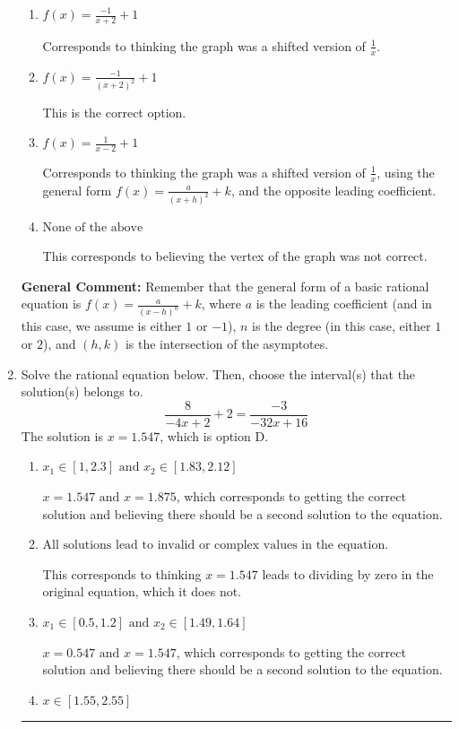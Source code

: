 \documentclass{extbook}[14pt]
\newcommand{\litem}[1]{\item #1

\rule{\textwidth}{0.4pt}}
\begin{document}
\begin{enumerate}
{\begin{enumerate}[label=\Alph*.]
Corresponds to using the general form $f(x) = \frac{a}{(x+h)^2}+k$ and the opposite leading coefficient.
\item \( f(x) = \frac{-1}{x + 2} + 1 \)

Corresponds to thinking the graph was a shifted version of $\frac{1}{x}$.
\item \( f(x) = \frac{-1}{(x + 2)^2} + 1 \)

This is the correct option.
\item \( f(x) = \frac{1}{x - 2} + 1 \)

Corresponds to thinking the graph was a shifted version of $\frac{1}{x}$, using the general form $f(x) = \frac{a}{(x+h)^2}+k$, and the opposite leading coefficient.
\item \( \text{None of the above} \)

This corresponds to believing the vertex of the graph was not correct.
\end{enumerate}

\textbf{General Comment:} Remember that the general form of a basic rational equation is $ f(x) = \frac{a}{(x-h)^n} + k$, where $a$ is the leading coefficient (and in this case, we assume is either $1$ or $-1$), $n$ is the degree (in this case, either $1$ or $2$), and $(h, k)$ is the intersection of the asymptotes.
}
\litem{
Solve the rational equation below. Then, choose the interval(s) that the solution(s) belongs to.
\[ \frac{8}{-4x + 2} + 2 = \frac{-3}{-32x + 16} \]The solution is \( x = 1.547 \), which is option D.\begin{enumerate}[label=\Alph*.]
\item \( x_1 \in [1, 2.3] \text{ and } x_2 \in [1.83,2.12] \)

$x = 1.547 \text{ and } x = 1.875$, which corresponds to getting the correct solution and believing there should be a second solution to the equation.
\item \( \text{All solutions lead to invalid or complex values in the equation.} \)

This corresponds to thinking $x = 1.547$ leads to dividing by zero in the original equation, which it does not.
\item \( x_1 \in [0.5, 1.2] \text{ and } x_2 \in [1.49,1.64] \)

$x = 0.547 \text{ and } x = 1.547$, which corresponds to getting the correct solution and believing there should be a second solution to the equation.
\item \( x \in [1.55,2.55] \)


\end{enumerate}}
\end{enumerate}
\end{document}

